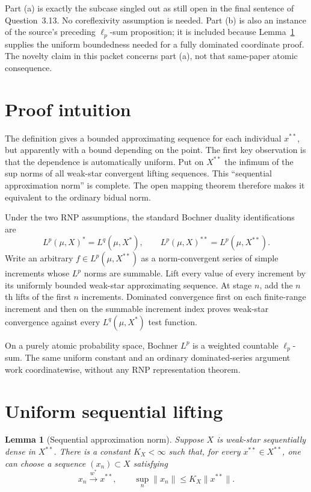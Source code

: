 \documentclass[11pt]{article}
\newtheorem{lemma}[theorem]{Lemma}
\newcommand{\wstar}{w^*}
\begin{document}
Part (a) is exactly the subcase singled out as still open in the final sentence
of Question~3.13.  No coreflexivity assumption is needed.  Part (b) is also an
instance of the source's preceding $\ell_p$-sum proposition; it is included
because Lemma~\ref{lem:gauge} supplies the uniform boundedness needed for a
fully dominated coordinate proof.  The novelty claim in this packet concerns
part (a), not that same-paper atomic consequence.

\section{Proof intuition}

The definition gives a bounded approximating sequence for each individual
$x^{**}$, but apparently with a bound depending on the point.  The first key
observation is that the dependence is automatically uniform.  Put on $X^{**}$
the infimum of the sup norms of all weak-star convergent lifting sequences.
This ``sequential approximation norm'' is complete.  The open mapping theorem
therefore makes it equivalent to the ordinary bidual norm.

Under the two RNP assumptions, the standard Bochner duality identifications
are
\[
  L^p(\mu,X)^*=L^q(\mu,X^*),
  \qquad
  L^p(\mu,X)^{**}=L^p(\mu,X^{**}).
\]
Write an arbitrary $f\in L^p(\mu,X^{**})$ as a norm-convergent series of
simple increments whose $L^p$ norms are summable.  Lift every value of every
increment by its uniformly bounded weak-star approximating sequence.  At
stage $n$, add the $n$th lifts of the first $n$ increments.  Dominated
convergence first on each finite-range increment and then on the summable
increment index proves weak-star convergence against every
$L^q(\mu,X^*)$ test function.

On a purely atomic probability space, Bochner $L^p$ is a weighted countable
$\ell_p$-sum.  The same uniform constant and an ordinary dominated-series
argument work coordinatewise, without any RNP representation theorem.

\section{Uniform sequential lifting}

\begin{lemma}[Sequential approximation norm]\label{lem:gauge}
Suppose $X$ is weak-star sequentially dense in $X^{**}$.  There is a constant
$K_X<\infty$ such that, for every $x^{**}\in X^{**}$, one can choose a
sequence $(x_n)\subset X$ satisfying
\begin{equation}\label{eq:uniform-lift}
 x_n\xrightarrow{\wstar}x^{**},
 \qquad
 \sup_n\|x_n\|\leq K_X\|x^{**}\|.
\end{equation}
\end{lemma}
\end{document}
